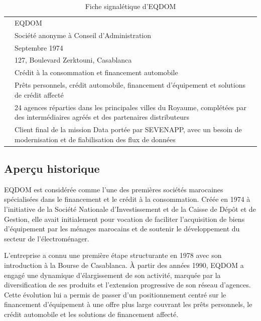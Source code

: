 \begin{table}[H]
\centering
\caption{Fiche signalétique d'EQDOM}
\label{tab:fiche-eqdom}
\PFETableSetup
{}
\begin{tabularx}{\textwidth}{@{}p{}Y@{}}
 &  \\
\midrule
{} & EQDOM \\
 & Société anonyme à Conseil d'Administration \\
 & Septembre 1974 \\
 & 127, Boulevard Zerktouni, Casablanca \\
 & Crédit à la consommation et financement automobile \\
 & Prêts personnels, crédit automobile, financement d'équipement et solutions de crédit affecté \\
 & 24 agences réparties dans les principales villes du Royaume, complétées par des intermédiaires agréés et des partenaires distributeurs \\
 & Client final de la mission Data portée par SEVENAPP, avec un besoin de modernisation et de fiabilisation des flux de données \\
\bottomrule
\end{tabularx}
\end{table}

\subsection{Aperçu historique}

EQDOM est considérée comme l'une des premières sociétés marocaines spécialisées dans le financement et le crédit à la consommation. Créée en 1974 à l'initiative de la Société Nationale d'Investissement et de la Caisse de Dépôt et de Gestion, elle avait initialement pour vocation de faciliter l'acquisition de biens d'équipement par les ménages marocains et de soutenir le développement du secteur de l'électroménager.

L'entreprise a connu une première étape structurante en 1978 avec son introduction à la Bourse de Casablanca. À partir des années 1990, EQDOM a engagé une dynamique d'élargissement de son activité, marquée par la diversification de ses produits et l'extension progressive de son réseau d'agences. Cette évolution lui a permis de passer d'un positionnement centré sur le financement d'équipement à une offre plus large couvrant les prêts personnels, le crédit automobile et les solutions de financement affecté.

